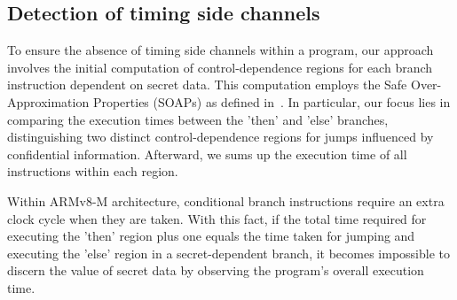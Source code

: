 \subsection{Detection of timing side channels}

To ensure the absence of timing side channels within a program, our
approach involves the initial computation of control-dependence regions for
each branch instruction dependent on secret data. This computation employs
the Safe Over-Approximation Properties (SOAPs) as defined
in~\cite{MantelAVR}. In particular, our focus lies in comparing the
execution times between the 'then' and 'else' branches, distinguishing two
distinct control-dependence regions for jumps influenced by confidential
information.
Afterward, we sums up the execution time of all instructions within each
region.

% 
%    
% 
% 

Within ARMv8-M architecture, conditional branch instructions require an
extra clock cycle when they are taken. With this fact, if the total time
required for executing the 'then' region plus one equals the time taken for
jumping and executing the 'else' region in a secret-dependent branch, it
becomes impossible to discern the value of secret data by observing the
program's overall execution time.

